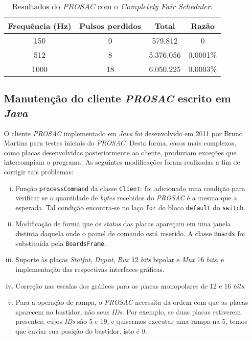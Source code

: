 \vspace{-12pt}

\begin{table}[h]

	\centering
	\caption{\label{tab:prosac} Resultados do \textit{PROSAC} com o
	\textit{Completely Fair Scheduler}.}
	\begin{tabular}{| c | c | c | c |}
		\hline
		\textbf{Frequência (Hz)} & \textbf{Pulsos perdidos} & \textbf{Total} &
		\textbf{Razão} \\ \hline 
		150 & 0 & 579.812  & 0 \\ \hline
		512 & 8 & 5.376.056 & 0.0001\% \\ \hline
		1000 & 18 & 6.050.225 & 0.0003\% \\ \hline
	\end{tabular}	    
\end{table}
 
 
\subsection {Manutenção do cliente \textit{PROSAC} escrito em \textit{Java}}

O cliente \textit{PROSAC} implementado em \textit{Java} foi desenvolvido em 2011
por Bruno Martins para testes iniciais do \textit{PROSAC}. Desta forma, casos mais
complexos, como placas desenvolvidas posteriormente ao cliente, produziam
exceções que interrompiam o programa. As seguintes modificações foram realizadas
a fim de corrigir tais problemas:

\begin {enumerate} [i.] 
  \item Função \texttt{processCommand} da classe \texttt{Client}: foi adicionado
  uma condição para verificar se a quantidade de \textit{bytes} recebidos do
  \textit{PROSAC} é a mesma que a esperada. Tal condição encontra-se no laço
  \texttt{for} do bloco \texttt{default} do \texttt{switch}.

  \item Modificação de forma que os \textit{status} das placas apareçam em uma
  janela distinta daquela onde o painel de comando está inserido. A classe
  \texttt{Boards} foi substituída pela \texttt{BoardsFrame}.
  
  \item Suporte às placas \textit{Statfnt}, \textit{Digint}, \textit{Rux} 12
  \textit{bits} bipolar e \textit{Mux} 16 \textit{bits}, e implementação das
  respectivas interfaces gráficas.

  \item Correção nas escalas dos gráficos para as placas monopolares de 12 e 16
  \textit{bits}.
  
  \item Para a operação de rampa, o \textit{PROSAC} necessita da ordem com que
  as placas aparecem no bastidor, não seus \textit{IDs}. Por exemplo, se duas
  placas estiverem presentes, cujos \textit{IDs} são 5 e 19, e quisermos
  executar uma rampa na 5, temos que enviar sua posição do bastidor, isto é 0.

\end{enumerate}

